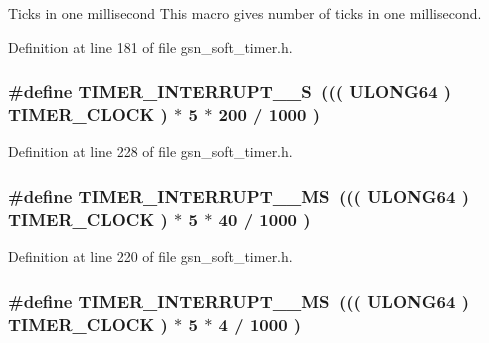 Ticks in one millisecond This macro gives number of ticks in one millisecond. 



Definition at line 181 of file gsn\_\-soft\_\-timer.h.

\hypertarget{a00673_ga1bf445c2d853b42c6c8f7d704f0c99ce}{
\subsubsection[{TIMER\_\-INTERRUPT\_\-1\_\-S}]{\setlength{\rightskip}{0pt plus 5cm}\#define TIMER\_\-INTERRUPT\_\_\-S~((( {\bf ULONG64} ) TIMER\_\-CLOCK ) $\ast$ 5 $\ast$ 200 / 1000 )}}
\label{a00673_ga1bf445c2d853b42c6c8f7d704f0c99ce}


Definition at line 228 of file gsn\_\-soft\_\-timer.h.

\hypertarget{a00673_ga59d6708c9cba03cf6fd9cf6c72529ab6}{
\subsubsection[{TIMER\_\-INTERRUPT\_\-200\_\-MS}]{\setlength{\rightskip}{0pt plus 5cm}\#define TIMER\_\-INTERRUPT\_\_\-MS~((( {\bf ULONG64} ) TIMER\_\-CLOCK ) $\ast$ 5 $\ast$ 40 / 1000 )}}
\label{a00673_ga59d6708c9cba03cf6fd9cf6c72529ab6}


Definition at line 220 of file gsn\_\-soft\_\-timer.h.

\hypertarget{a00673_ga0680372985c2ad123fd4e1984f1ff9a1}{
\subsubsection[{TIMER\_\-INTERRUPT\_\-20\_\-MS}]{\setlength{\rightskip}{0pt plus 5cm}\#define TIMER\_\-INTERRUPT\_\_\-MS~((( {\bf ULONG64} ) TIMER\_\-CLOCK ) $\ast$ 5 $\ast$ 4 / 1000 )}}
\label{a00673_ga0680372985c2ad123fd4e1984f1ff9a1}


